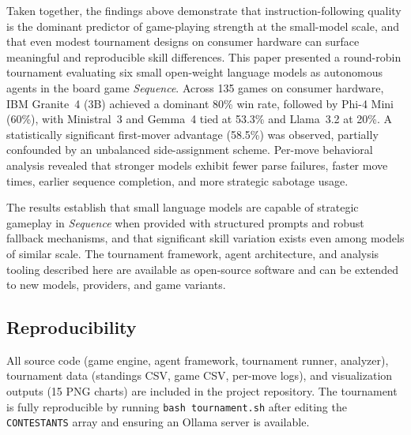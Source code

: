\documentclass[11pt]{article}
\begin{document}
Taken together, the findings above demonstrate that instruction-following quality is the dominant predictor of game-playing strength at the small-model scale, and that even modest tournament designs on consumer hardware can surface meaningful and reproducible skill differences. This paper presented a round-robin tournament evaluating six small open-weight language models as autonomous agents in the board game \textit{Sequence}. Across 135 games on consumer hardware, IBM Granite~4 (3B) achieved a dominant 80\% win rate, followed by Phi-4 Mini (60\%), with Ministral~3 and Gemma~4 tied at 53.3\% and Llama~3.2 at 20\%. A statistically significant first-mover advantage (58.5\%) was observed, partially confounded by an unbalanced side-assignment scheme. Per-move behavioral analysis revealed that stronger models exhibit fewer parse failures, faster move times, earlier sequence completion, and more strategic sabotage usage.

The results establish that small language models are capable of strategic gameplay in \textit{Sequence} when provided with structured prompts and robust fallback mechanisms, and that significant skill variation exists even among models of similar scale. The tournament framework, agent architecture, and analysis tooling described here are available as open-source software and can be extended to new models, providers, and game variants.

\subsection*{Reproducibility}

All source code (game engine, agent framework, tournament runner, analyzer), tournament data (standings CSV, game CSV, per-move logs), and visualization outputs (15 PNG charts) are included in the project repository. The tournament is fully reproducible by running \texttt{bash tournament.sh} after editing the \texttt{CONTESTANTS} array and ensuring an Ollama server is available.

\end{document}
